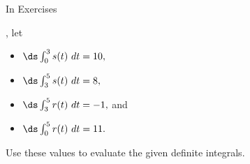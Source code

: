 \begin{exerciseset}{In Exercises}{, let
\begin{itemize}
\item $\ds \int_0^3 s(t)\ dt = 10,$
\item $\ds \int_3^5 s(t) \ dt=8,$
\item $\ds \int_3^5 r(t)\ dt = -1,$ and
\item $\ds \int_0^5 r(t)\ dt = 11.$
\end{itemize}
Use these values to evaluate the given definite integrals.}





\end{exerciseset}
